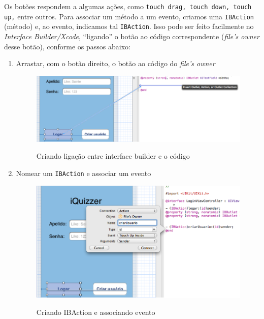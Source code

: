      
    Os botões respondem a algumas ações, como \texttt{touch drag, touch down, touch up,} entre outros. Para associar um método a um evento, criamos uma \texttt{IBAction} (método) e, ao evento, indicamos tal \texttt{IBAction}. Isso pode ser feito facilmente no \emph{Interface Builder/Xcode}, ``ligando'' o botão ao código correspondente (\emph{file's owner} desse botão), conforme os passos abaixo:
\begin{enumerate}     
\item Arrastar, com o botão direito, o botão ao código do \emph{file's owner}
		 \begin{figure}[H]
		   \centering
		   \includegraphics{figs/iosbtn1.png}\\
		   \caption{ Criando ligação entre interface builder e o código }
		   \label{FIG:iosbtn1}
		 \end{figure}
         
 \item Nomear um \texttt{IBAction} e associar um evento
 \begin{figure}[H]
   \centering
   \includegraphics{figs/iosbtn2.png}\\
   \caption{ Criando IBAction e associando evento }
   \label{FIG:iosbtn2}
 \end{figure}
 
 \end{enumerate}    
     
